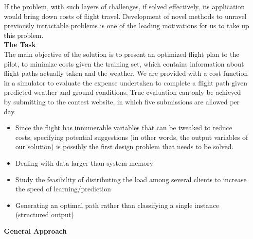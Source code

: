 \documentclass{article}[9pt]
\begin{document}
If the problem, with such layers of challenges, if solved effectively, its application would bring down costs of flight travel. Development of novel methods to unravel previously intractable problems is one of the leading motivations for us to take up this problem.\\
[\baselineskip]
\noindent
\Large{\textbf{The Task}} \\
\noindent The main objective of the solution is to present an optimized flight plan to the pilot, to minimize costs given the training set, which contains information about flight paths actually taken and the weather. We are provided with a cost function in a simulator to evaluate the expense undertaken to complete a flight path given predicted weather and ground conditions. True evaluation can only be achieved by submitting to the contest website, in which five submissions are allowed per day.
\begin{itemize}
	\item Since the flight has innumerable variables that can be tweaked to reduce costs, specifying potential suggestions (in other words, the output variables of our solution) is possibly the first design problem that needs to be solved.
	\item Dealing with data larger than system memory
	\item Study the feasibility of distributing the load among several clients to increase the speed of learning/prediction
	\item Generating an optimal path rather than classifying a single instance (structured output)
\end{itemize}
\noindent
\Large{\textbf{General Approach}}%
\end{document}
